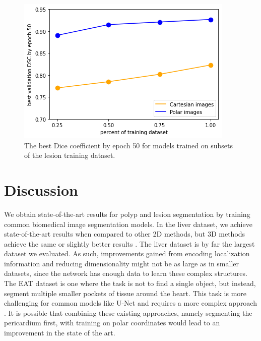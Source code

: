 		\begin{figure}[h]
		\centering
		\includegraphics[width=0.65\linewidth]{images/4/dsc-vs-dataset-percent}
		\caption{The best Dice coefficient by epoch 50 for models trained on subsets of the lesion training dataset.}
		\label{fig:dataset-vs-dsc}
	\end{figure}
	
	\section{Discussion}
	
We obtain state-of-the-art results for polyp and lesion segmentation by training common biomedical image segmentation models. In the liver dataset, we achieve state-of-the-art results when compared to other 2D methods, but 3D methods 
achieve the same or slightly better results \cite{valanarasuKiUNetOvercompleteConvolutional2020a}. 
The liver dataset is 
by far the largest dataset we evaluated. As such, improvements gained from 
encoding localization information and reducing dimensionality might not be as large as in smaller 
datasets, since the network has enough data to learn these complex structures.
The EAT dataset is one where the task is not to find a single object, but instead, segment multiple smaller 
pockets of tissue around the heart. This task is more challenging for common models like U-Net and 
requires a more complex approach \cite{zhangAutomaticEpicardialFat2020a}. It is possible that combining 
these existing approaches, namely segmenting the pericardium first, with training on polar coordinates 
would lead to an improvement in the state of the art.

